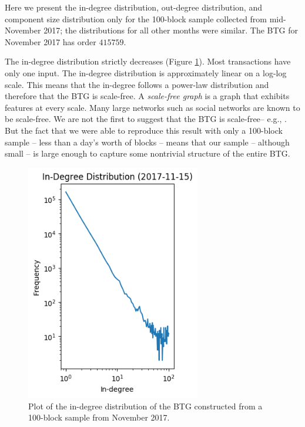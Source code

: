\documentclass[letterpaper, 10 pt, conference]{ieeeconf}  %
\begin{document}
Here we present the in-degree distribution, out-degree distribution, and component size distribution only for the 100-block sample collected from mid-November 2017; the distributions for all other months were similar. The BTG for November 2017 has order $415759$.

The in-degree distribution strictly decreases (Figure \ref{in-degree-distro}). Most transactions have only one input. The in-degree distribution is approximately linear on a log-log scale. This means that the in-degree follows a power-law distribution and therefore that the BTG is scale-free. A \emph{scale-free graph} is a graph that exhibits features at every scale. Many large networks such as social networks are known to be scale-free. We are not the first to suggest that the BTG is scale-free-- e.g., \cite{kondor2014rich}. But the fact that we were able to reproduce this result with only a 100-block sample -- less than a day's worth of blocks -- means that our sample -- although small -- is large enough to capture some nontrivial structure of the entire BTG.

\begin{figure}
\centering
\includegraphics[width=3in]{Plots/In_degree_distros/2017-11-15.png}
\caption{\label{in-degree-distro} Plot of the in-degree distribution of the BTG constructed from a 100-block sample from November 2017.}
\end{figure}
\end{document}
